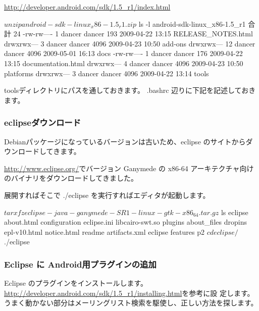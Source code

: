 \documentclass[mingoth,a4paper]{jsarticle}
\begin{document}
\begin{commandline}
\url{http://developer.android.com/sdk/1.5_r1/index.html}

\begin{commandline}
$ unzip android-sdk-linux_x86-1.5_r1.zip
$ ls -l android-sdk-linux_x86-1.5_r1
合計 24
-rw-rw----  1 dancer dancer  193 2009-04-22 13:15 RELEASE_NOTES.html
drwxrwx---  3 dancer dancer 4096 2009-04-23 10:50 add-ons
drwxrwx--- 12 dancer dancer 4096 2009-05-01 16:13 docs
-rw-rw----  1 dancer dancer  176 2009-04-22 13:15 documentation.html
drwxrwx---  4 dancer dancer 4096 2009-04-23 10:50 platforms
drwxrwx---  3 dancer dancer 4096 2009-04-22 13:14 tools
\end{commandline}

toolsディレクトリにパスを通しておきます。
.bashrc 辺りに下記を記述しておきます。

\subsubsection{eclipseダウンロード}

Debianパッケージになっているバージョンは古いため、eclipse のサイトからダウンロードしてきます。

\url{http://www.eclipse.org/}でバージョン Ganymede の
x86-64 アーキテクチャ向けのバイナリをダウンロードしてきました。

展開すればそこで ./eclipse を実行すればエディタが起動します。

\begin{commandline}
$ tar xfz eclipse-java-ganymede-SR1-linux-gtk-x86_64.tar.gz
$ ls eclipse
about.html     configuration  eclipse.ini   libcairo-swt.so  plugins
about_files    dropins	      epl-v10.html  notice.html      readme
artifacts.xml  eclipse	      features	    p2
$ cd eclipse/
$ ./eclipse 

\end{commandline}

\subsubsection{Eclipse に Android用プラグインの追加}

Eclipse のプラグインをインストールします。
\url{http://developer.android.com/sdk/1.5_r1/installing.html}を参考に設
定します。
うまく動かない部分はメーリングリスト検索を駆使し、正しい方法を探します。


\end{commandline}
\end{document}
